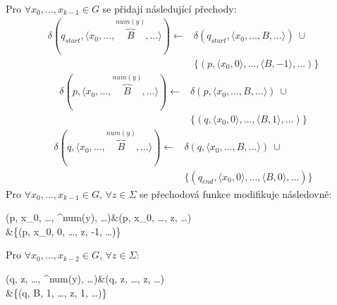 \documentclass[thesis=B,czech]{FITthesis}[2019/12/23]
\theoremstyle{definition}
\begin{document}
\begin{enumerate}
{	Pro  $\forall x_0, \dots, x_{k-1} \in G$ se přidají následující přechody:
		\begin{equation*}\begin{split}\delta(q_{start}, \langle  x_0, \dots, \overbrace{B}^{num(y)}, \dots \rangle)\leftarrow&\delta(q_{start}, \langle  x_0, \dots, B, \dots \rangle) \ \cup\\&\{(p, \langle x_0, 0\rangle, \dots, \langle B, -1\rangle, \dots)\}\end{split}\end{equation*}
		\begin{equation*}\begin{split}\delta(p, \langle  x_0, \dots, \overbrace{B}^{num(y)}, \dots \rangle)\leftarrow&\delta(p, \langle  x_0, \dots, B, \dots \rangle) \ \cup\\&\{(q, \langle x_0, 0\rangle, \dots, \langle B, 1\rangle, \dots)\}\end{split}\end{equation*}
		\begin{equation*}\begin{split}\delta(q, \langle  x_0, \dots, \overbrace{B}^{num(y)}, \dots \rangle)\leftarrow&\delta(q, \langle  x_0, \dots, B, \dots \rangle) \ \cup\\&\{(q_{end}, \langle x_0, 0\rangle, \dots, \langle B, 0\rangle, \dots)\}\end{split}\end{equation*}
	Pro $\forall x_0, \dots, x_{k-1} \in G$,  $\forall z \in \Sigma$ se přechodová funkce modifikuje následovně:
	\begin{flalign*}\delta(p, \langle  x_0, \dots, ^{num(y)}, \dots \rangle)\leftarrow&\delta(p, \langle  x_0, \dots, z, \dots \rangle) \ \cup\\&\{(p, \langle x_0, 0\rangle, \dots, \langle z, -1\rangle, \dots)\}\end{flalign*}
		Pro $\forall x_0, \dots, x_{k-2} \in G$,  $\forall z \in \Sigma$:
	\begin{flalign*}\delta(q, \langle  z, \dots, ^{num(y)}, \dots \rangle)\leftarrow&\delta(q, \langle  z, \dots, z, \dots \rangle) \ \cup\\&\{(q, \langle B, 1\rangle, \dots, \langle z, 1\rangle, \dots)\}\end{flalign*}
	}


\end{enumerate}
\end{document}
